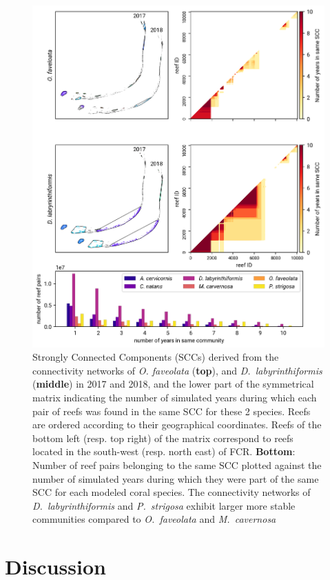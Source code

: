 \documentclass[preprint,12pt,authoryear]{elsarticle}
\begin{document}
	
	\begin{figure}
		\centering
		\includegraphics[width=.9\textwidth]{figures/comparison_sccs.png}
		\caption{Strongly Connected Components (SCCs) derived from the connectivity networks of \textit{O. faveolata} (\textbf{top}), and \textit{D.~labyrinthiformis} (\textbf{middle}) in 2017 and 2018, and the lower part of the symmetrical matrix indicating the number of simulated years during which each pair of reefs was found in the same SCC for these 2 species. Reefs are ordered according to their geographical coordinates. Reefs of the bottom left (resp. top right) of the matrix correspond to reefs located in the south-west (resp. north east) of FCR. \textbf{Bottom}: Number of reef pairs belonging to the same SCC plotted against the number of simulated years during which they were part of the same SCC for each modeled coral species. The connectivity networks of \textit{D.~labyrinthiformis} and \textit{P.~strigosa} exhibit larger more stable communities compared to \textit{O.~faveolata} and \textit{M.~cavernosa}}\label{fig:scc}
	\end{figure}
	
	
	\section*{Discussion}
	
\end{document}
